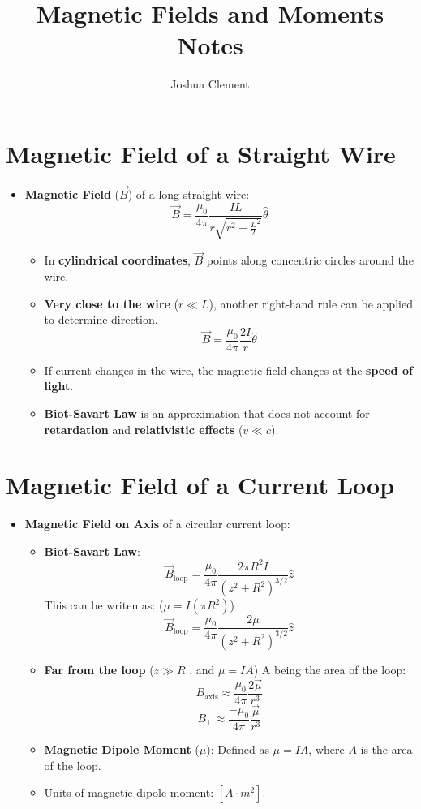 \documentclass{article}
\title{Magnetic Fields and Moments Notes}
\author{Joshua Clement}
\begin{document}
\maketitle

\section*{Magnetic Field of a Straight Wire}
\begin{itemize}
    \item \textbf{Magnetic Field} (\(\vec{B}\)) of a long straight wire:
    \[
        \vec{B} = \frac{\mu_0}{4 \pi} \frac{I L}{r \sqrt {r^2 + \frac{L}{2}^2}} \hat{\theta}
    \]
    \begin{itemize}
        \item In \textbf{cylindrical coordinates}, \(\vec{B}\) points along concentric circles around the wire.
        \item \textbf{Very close to the wire} (\(r \ll L\)), another right-hand rule can be applied to determine direction.
        \[
        \vec{B} = \frac{\mu_0}{4 \pi} \frac{2 I}{r} \hat{\theta}
        \]
        \item If current changes in the wire, the magnetic field changes at the \textbf{speed of light}.
        \item \textbf{Biot-Savart Law} is an approximation that does not account for \textbf{retardation} and \textbf{relativistic effects} (\(v \ll c\)).
    \end{itemize}
\end{itemize}

\section*{Magnetic Field of a Current Loop}
\begin{itemize}
    \item \textbf{Magnetic Field on Axis} of a circular current loop:
    \begin{itemize}
        \item \textbf{Biot-Savart Law}:
        \[
            \vec{B}_{\text{loop}} = \frac{\mu_0}{4 \pi}  \frac{2 \pi R^2 I}{(z^2 + R^2)^{3/2}} \hat{z}
        \]
        This can be writen as: (\(\mu = I(\pi R^2)\))
        \[
            \vec{B}_{\text{loop}} = \frac{\mu_0}{4 \pi}  \frac{2 \mu}{(z^2 + R^2)^{3/2}} \hat{z}
        \]
        \item \textbf{Far from the loop} (\(z \gg R\) , and \(\mu = IA\)) A being the area of the loop:
        \[
        B_{\text{axis}} \approx \frac{\mu_0}{4 \pi} \frac{2 \vec{\mu}}{r^3}
        \]
        \[
        B_{\perp} \approx \frac{-\mu_0}{4 \pi} \frac{\vec{\mu}}{r^3}
        \]
        \item \textbf{Magnetic Dipole Moment} (\(\mu\)): Defined as \(\mu = I A\), where \(A\) is the area of the loop.
        \item Units of magnetic dipole moment: \([A \cdot m^2]\).

    \end{itemize}
\end{itemize}
\end{document}
